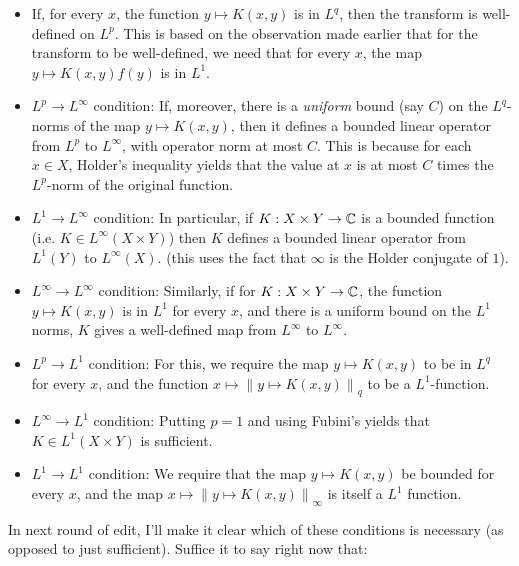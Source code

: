 \documentclass[a4paper]{amsart}
\newcommand{\norm}[1]{\left\|#1\right\|}
\begin{document}
\begin{itemize}

\item If, for every $x$, the function $y \mapsto K(x,y)$ is in $L^q$,
  then the transform is well-defined on $L^p$. This is based on the
  observation made earlier that for the transform to be well-defined,
  we need that for every $x$, the map $y \mapsto K(x,y)f(y)$ is in
  $L^1$.

\item $L^p \to L^\infty$ condition: If, moreover, there is a {\em
    uniform} bound (say $C$) on the $L^q$-norms of the map $y \mapsto
  K(x,y)$, then it defines a bounded linear operator from $L^p$ to
  $L^\infty$, with operator norm at most $C$. This is because for each
  $x \in X$, Holder's inequality yields that the value at $x$ is at
  most $C$ times the $L^p$-norm of the original function.

\item $L^1 \to L^\infty$ condition: In particular, if $K: X \times Y
  \to \mathbb{C}$ is a bounded function (i.e. $K \in L^\infty(X \times Y)$)
  then $K$ defines a bounded linear operator from $L^1(Y)$ to
  $L^\infty(X)$. (this uses the fact that $\infty$ is the Holder
  conjugate of $1$).

\item $L^\infty \to L^\infty$ condition: Similarly, if for $K:X \times
  Y \to \mathbb{C}$, the function $y \mapsto K(x,y)$ is in $L^1$ for every
  $x$, and there is a uniform bound on the $L^1$ norms, $K$ gives a
  well-defined map from $L^\infty$ to $L^\infty$.

\item $L^p \to L^1$ condition: For this, we require the map $y \mapsto
  K(x,y)$ to be in $L^q$ for every $x$, and the function $x \mapsto
  \norm{y \mapsto K(x,y)}_q$ to be a $L^1$-function.

\item $L^\infty \to L^1$ condition: Putting $p = 1$ and using Fubini's
  yields that $K \in L^1(X \times Y)$ is sufficient.

\item $L^1 \to L^1$ condition: We require that the map $y \mapsto
  K(x,y)$ be bounded for every $x$, and the map $x \mapsto \norm{y
    \mapsto K(x,y)}_\infty$ is itself a $L^1$ function.
\end{itemize}

In next round of edit, I'll make it clear which of these conditions is
necessary (as opposed to just sufficient). Suffice it to say right now that:
\end{document}
